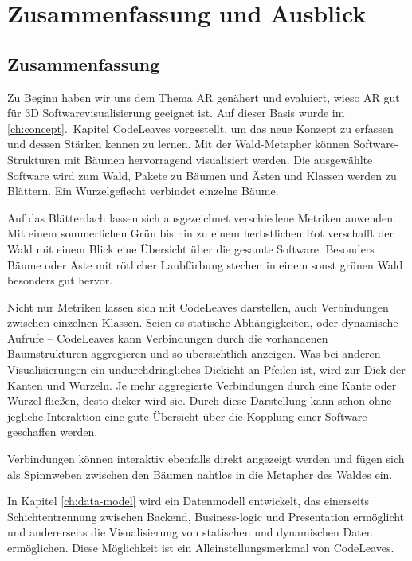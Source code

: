 \chapter{Zusammenfassung und Ausblick}
\label{ch:conclusion}

\section{Zusammenfassung}

Zu Beginn haben wir uns dem Thema AR genähert und evaluiert, wieso AR gut für 3D Softwarevisualisierung geeignet ist. Auf dieser Basis wurde im \ref{ch:concept}.\ Kapitel CodeLeaves vorgestellt, um das neue Konzept zu erfassen und dessen Stärken kennen zu lernen. Mit der Wald-Metapher können Software-Strukturen mit Bäumen hervorragend visualisiert werden. Die ausgewählte Software wird zum Wald, Pakete zu Bäumen und Ästen und Klassen werden zu Blättern. Ein Wurzelgeflecht verbindet einzelne Bäume.

Auf das Blätterdach lassen sich ausgezeichnet verschiedene Metriken anwenden. Mit einem sommerlichen Grün bis hin zu einem herbstlichen Rot verschafft der Wald mit einem Blick eine Übersicht über die gesamte Software. Besonders Bäume oder Äste mit rötlicher Laubfärbung stechen in einem sonst grünen Wald besonders gut hervor.

Nicht nur Metriken lassen sich mit CodeLeaves darstellen, auch Verbindungen zwischen einzelnen Klassen. Seien es statische Abhängigkeiten, oder dynamische Aufrufe -- CodeLeaves kann Verbindungen durch die vorhandenen Baumstrukturen aggregieren und so übersichtlich anzeigen. Was bei anderen Visualisierungen ein undurchdringliches Dickicht an Pfeilen ist, wird zur Dick der Kanten und Wurzeln. Je mehr aggregierte Verbindungen durch eine Kante oder Wurzel fließen, desto dicker wird sie. Durch diese Darstellung kann schon ohne jegliche Interaktion eine gute Übersicht über die Kopplung einer Software geschaffen werden.

Verbindungen können interaktiv ebenfalls direkt angezeigt werden und fügen sich als Spinnweben zwischen den Bäumen nahtlos in die Metapher des Waldes ein.

In Kapitel \ref{ch:data-model} wird ein Datenmodell entwickelt, das einerseits Schichtentrennung zwischen Backend, Business-logic und Presentation ermöglicht und andererseits die Visualisierung von statischen und dynamischen Daten ermöglichen. Diese Möglichkeit ist ein Alleinstellungsmerkmal von CodeLeaves.

